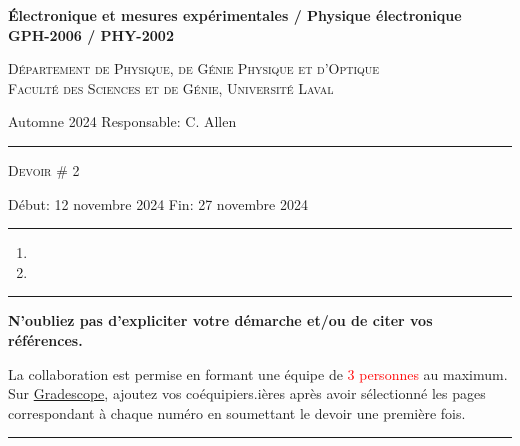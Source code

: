 \documentclass[english,french,12pt]{article}
\newcommand{\onlyinsubfile}[1]{#1} %
\begin{document}
\renewcommand{\onlyinsubfile}[1]{}
%
%
\begin{center}
    \textbf{\large{Électronique et mesures expérimentales / Physique électronique}}\\
    \vspace{0.2em}
    \textbf{GPH-2006 / PHY-2002}\par
    \textsc{Département de Physique, de Génie Physique et d'Optique\\
    Faculté des Sciences et de Génie, Université Laval}
\end{center}
\noindent Automne 2024 \hfill Responsable: C. Allen
\vspace{0.2em}
\hrule
\vspace{-1.5ex}
\begin{center}
    \textsc{Devoir \# 2}
\end{center}
\vspace{-4ex}
Début: 12 novembre 2024 \hfill Fin: 27 novembre 2024\par
\vspace{0.4em}
\hrule
\justify
%

\begin{enumerate}[label=\Roman*., wide, labelwidth=!, labelindent=0pt]
    \setcounter{enumi}{0}
    \item 
    \vspace{6ex}
    \item 
\end{enumerate}
 
\vfill
\hrule
\vspace{0.3em}
\centering
\textbf{N'oubliez pas d'expliciter votre démarche et/ou de citer vos références.}\par
\vspace{-0.3em}
La collaboration est permise en formant une équipe de \textcolor{red}{3 personnes} au maximum. Sur \href{https://www.gradescope.com/}{Gradescope}, ajoutez vos coéquipiers.ières après avoir sélectionné les pages correspondant à chaque numéro en soumettant le devoir une première fois.\par
\vspace{1em}
\hrule
\end{document}
